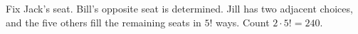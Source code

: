 Fix Jack's seat. Bill's opposite seat is determined. Jill has two adjacent choices, and the five others fill the remaining seats in $5!$ ways. Count $2\cdot5!=\boxed{240}$.
